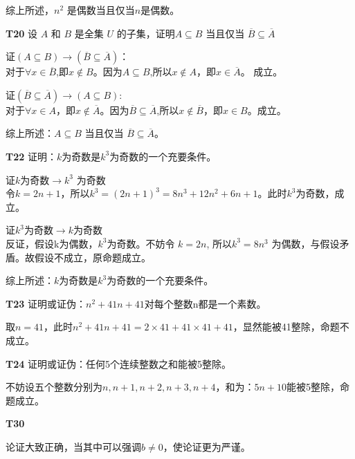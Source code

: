 \documentclass{article}
\begin{document}
综上所述，$n^2$ 是偶数当且仅当$n$是偶数。

\vspace{10pt}

\textbf{T20} 设 $A$ 和 $B$ 是全集 $U$ 的子集，证明$A \subseteq B$ 当且仅当 $\overline{B} \subseteq \overline{A}$

证$(A \subseteq B) \rightarrow (\overline{B} \subseteq \overline{A})$：\\
对于$\forall x \in \overline{B}$,即$x \notin B$。因为$A \subseteq B$,所以$x \notin A$，即$x \in \overline{A}$。 成立。

证$(\overline{B} \subseteq \overline{A}) \rightarrow (A \subseteq B)$:\\
对于$\forall x \in A$，即$x \notin \overline{A}$。因为$\overline{B} \subseteq \overline{A}$,所以$x \notin \overline{B}$，即$x \in B$。成立。

综上所述：$A \subseteq B$ 当且仅当 $\overline{B} \subseteq \overline{A}$。

\vspace{10pt}

\textbf{T22} 证明：$k$为奇数是$k^3$为奇数的一个充要条件。

证$k$为奇数$\rightarrow k^3$ 为奇数\\
令$k = 2n + 1$，所以$k^3 = (2n + 1)^3 = 8n^3 + 12n^2 + 6n + 1$。此时$k^3$为奇数，成立。

证$k^3$为奇数$\rightarrow k$为奇数\\
反证，假设k为偶数，$k^3$为奇数。不妨令 $k = 2n$, 所以$k^3 = 8n^3$ 为偶数，与假设矛盾。故假设不成立，原命题成立。

综上所述：$k$为奇数是$k^3$为奇数的一个充要条件。

\vspace{10pt}

\textbf{T23} 证明或证伪：$n^2 + 41n + 41$对每个整数n都是一个素数。

取$n = 41$，此时$n^2 + 41n + 41 = 2 \times 41 + 41 \times 41 + 41$，显然能被41整除，命题不成立。

\vspace{10pt}

\textbf{T24} 证明或证伪：任何5个连续整数之和能被5整除。

不妨设五个整数分别为$n, n + 1, n + 2, n + 3, n + 4$，和为：$5n + 10$能被5整除，命题成立。

\vspace{10pt}

\textbf{T30} 

论证大致正确，当其中可以强调$b \neq 0$，使论证更为严谨。
\end{document}
